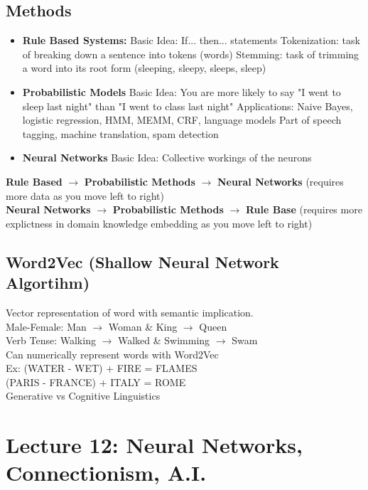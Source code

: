 \documentclass{article}
\begin{document}
\subsection{Methods}
\begin{itemize}
    \item \textbf{Rule Based Systems:} 
        \subitem Basic Idea: If... then... statements
        \subitem Tokenization: task of breaking down a sentence into tokens (words) 
        \subitem Stemming: task of trimming a word into its root form (sleeping, sleepy, sleeps, sleep)
    \item \textbf{Probabilistic Models}
        \subitem Basic Idea: You are more likely to say "I went to sleep last night" than "I went to class last night"
        \subitem Applications: Naive Bayes, logistic regression, HMM, MEMM, CRF, language models 
        \subitem Part of speech tagging, machine translation, spam detection
    \item \textbf{Neural Networks}
        \subitem Basic Idea: Collective workings of the neurons 
\end{itemize}
\textbf{Rule Based} $\rightarrow$ \textbf{Probabilistic Methods} $\rightarrow$ \textbf{Neural Networks} (requires more data as you move left to right)\\
\textbf{Neural Networks}  $\rightarrow$ \textbf{Probabilistic Methods} $\rightarrow$ \textbf{Rule Base} (requires more explictness in domain knowledge embedding as you move left to right)

\subsection{Word2Vec (Shallow Neural Network Algortihm)}
Vector representation of word with semantic implication. \\
Male-Female: Man $\rightarrow$ Woman \& King $\rightarrow$ Queen \\
Verb Tense: Walking $\rightarrow$ Walked \& Swimming $\rightarrow$ Swam \\

\noindent Can numerically represent words with Word2Vec \\
Ex: (WATER - WET) + FIRE = FLAMES \\
(PARIS - FRANCE) + ITALY = ROME \\

Generative vs Cognitive Linguistics

\newpage 
\section{Lecture 12: Neural Networks, Connectionism, A.I.}
\end{document}
